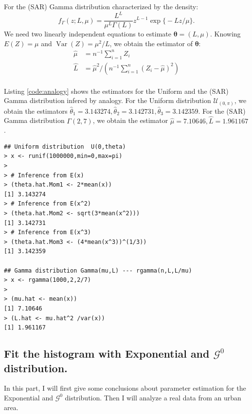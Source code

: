 \documentclass[conference,onecolumn]{IEEEtran}
\begin{document}
 
For the (SAR) Gamma distribution characterized by the density:
\begin{equation}
f_\Gamma(z;L,\mu) = \frac{L^L}{\mu^{L}\Gamma(L)} z^{L-1} 
\exp\big\{ -L z / \mu
\big\}.
\label{eq:SARGammaDensity}
\end{equation}
We need two linearly independent equations to estimate $\bm{\theta}=(L,\mu)$. Knowing $E(Z)=\mu$ and $\operatorname{Var}(Z)=\mu^2/L$, we obtain the estimator of $\bm{\theta}$:
\begin{equation}
\begin{split}
\widehat{\mu} &= n^{-1}\sum_{i=1}^n Z_i \\
\widehat L &= \widehat{\mu}^2 / (n^{-1}\sum_{i=1}^n (Z_i - \widehat{\mu})^2) \\
\end{split}
\end{equation} 

Listing \ref{code:analogy} shows the estimators for the Uniform and the (SAR) Gamma distribution infered by analogy. For the Uniform distribution $\mathcal U_{(0,\pi)}$, we obtain the estimators $\widehat{\theta}_1=3.143274, \widehat{\theta}_2=3.142731, \widehat{\theta}_3=3.142359$. For the (SAR) Gamma distribution $\Gamma(2,7)$, we obtain the estimator $\widehat{\mu}=7.10646, \widehat L=1.961167$.

\begin{lstlisting}[caption={Parameter estimation for the Uniform and the (SAR) Gamma distribution (Inference by analogy)},label={code:analogy}]
## Uniform distribution  U(0,theta)
> x <- runif(1000000,min=0,max=pi)
>
> # Inference from E(x)
> (theta.hat.Mom1 <- 2*mean(x))
[1] 3.143274
> # Inference from E(x^2)
> (theta.hat.Mom2 <- sqrt(3*mean(x^2)))
[1] 3.142731
> # Inference from E(x^3)
> (theta.hat.Mom3 <- (4*mean(x^3))^(1/3))
[1] 3.142359

## Gamma distribution Gamma(mu,L) --- rgamma(n,L,L/mu)
> x <- rgamma(1000,2,2/7)
>
> (mu.hat <- mean(x))
[1] 7.10646
> (L.hat <- mu.hat^2 /var(x))
[1] 1.961167
\end{lstlisting}


\subsection{Fit the histogram with Exponential and $\mathcal{G}^0$ distribution.}

In this part, I will first give some conclusions about parameter estimation for the Exponential and $\mathcal{G}^0$ distribution. Then I will analyze a real data from an urban area.
\end{document}
